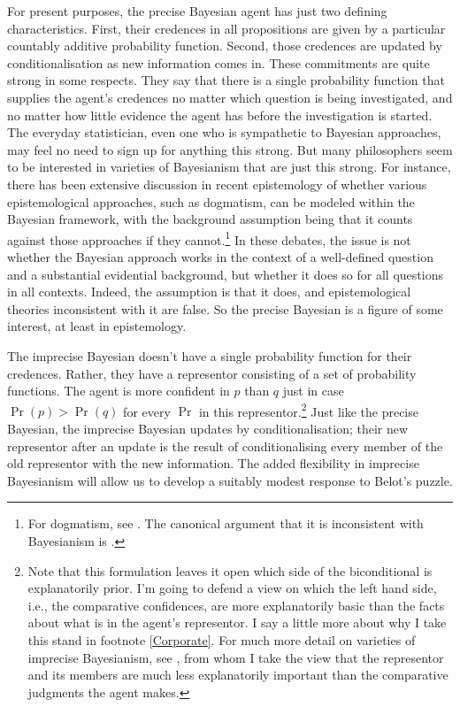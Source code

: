 For present purposes, the precise Bayesian agent has just two defining characteristics. First, their credences in all propositions are given by a particular countably additive probability function. Second, those credences are updated by conditionalisation as new information comes in. These commitments are quite strong in some respects. They say that there is a single probability function that supplies the agent's credences no matter which question is being investigated, and no matter how little evidence the agent has before the investigation is started. The everyday statistician, even one who is sympathetic to Bayesian approaches, may feel no need to sign up for anything this strong. But many philosophers seem to be interested in varieties of Bayesianism that are just this strong. For instance, there has been extensive discussion in recent epistemology of whether various epistemological approaches, such as dogmatism, can be modeled within the Bayesian framework, with the background assumption being that it counts against those approaches if they cannot.\footnote{For dogmatism, see \citet{Pryor2000}. The canonical argument that it is inconsistent with Bayesianism is \citet{White2006}.} In these debates, the issue is not whether the Bayesian approach works in the context of a well-defined question and a substantial evidential background, but whether it does so for all questions in all contexts. Indeed, the assumption is that it does, and epistemological theories inconsistent with it are false. So the precise Bayesian is a figure of some interest, at least in epistemology.

The imprecise Bayesian doesn't have a single probability function for their credences. Rather, they have a representor consisting of a set of probability functions. The agent is more confident in $p$ than $q$ just in case $\Pr(p) > \Pr(q)$ for every $\Pr$ in this representor.\footnote{Note that this formulation leaves it open which side of the biconditional is explanatorily prior. I'm going to defend a view on which the left hand side, i.e., the comparative confidences, are more explanatorily basic than the facts about what is in the agent's representor. I say a little more about why I take this stand in footnote \ref{Corporate}. For much more detail on varieties of imprecise Bayesianism, see \citet{Walley1991}, from whom I take the view that the representor and its members are much less explanatorily important than the comparative judgments the agent makes.} Just like the precise Bayesian, the imprecise Bayesian updates by conditionalisation; their new representor after an update is the result of conditionalising every member of the old representor with the new information. The added flexibility in imprecise Bayesianism will allow us to develop a suitably modest response to Belot's puzzle.

